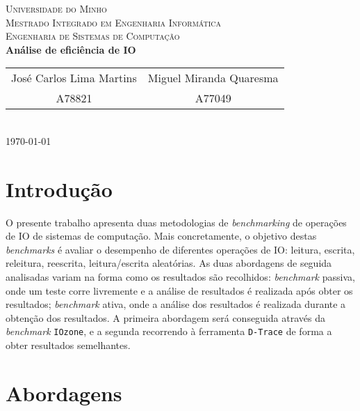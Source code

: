 \documentclass{article}
\begin{document}
{
\center
\textsc{\Large Universidade do Minho} \\ [0.5cm]
\textsc{\Large Mestrado Integrado em Engenharia Informática} \\ [0.5cm]
\textsc{\large Engenharia de Sistemas de Computação} \\ [0.5cm]

{\LARGE \bfseries Análise de eficiência de IO} \\[0.2cm]

\begin{tabular}{c c}
    José Carlos Lima Martins & Miguel Miranda Quaresma \\
    A78821 & A77049  \\
\end{tabular} \\[0.5cm]

\today \\[1cm]
}

\section{Introdução}
O presente trabalho apresenta duas metodologias de \textit{benchmarking} de operações de IO de sistemas de computação. Mais concretamente, o 
objetivo destas \textit{benchmarks} é avaliar o desempenho de diferentes operações de IO: leitura, escrita, releitura, reescrita, leitura/escrita 
aleatórias. As duas abordagens de seguida analisadas variam na forma como os resultados são recolhidos: \textit{benchmark} passiva, onde um 
teste corre livremente e a análise de resultados é realizada após obter os resultados; \textit{benchmark} ativa, onde a 
análise dos resultados é realizada durante a obtenção dos resultados. A primeira abordagem será conseguida através da \textit{benchmark}
\texttt{IOzone}, e a segunda recorrendo à ferramenta \texttt{D-Trace} de forma a obter resultados semelhantes. 

\section{Abordagens}
\end{document}
